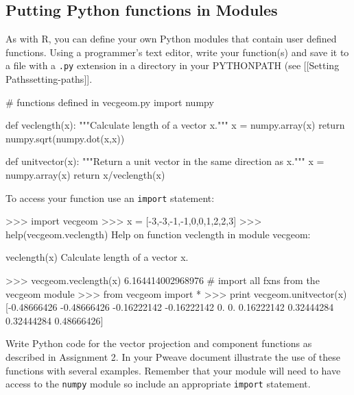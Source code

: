 \subsection{Putting Python functions in Modules}

As with R, you can define your own Python modules that contain user
defined functions. Using a programmer's text editor, write your
function(s) and save it to a file with a \lstinline!.py! extension in a
directory in your PYTHONPATH (see {[}{[}Setting
Paths\textbar{}setting-paths{]}{]}.

\begin{python}
# functions defined in vecgeom.py
import numpy

def veclength(x):
    """Calculate length of a vector x.""" 
    x = numpy.array(x)
    return numpy.sqrt(numpy.dot(x,x))


def unitvector(x):
    """Return a unit vector in the same direction as x."""
    x = numpy.array(x)
    return x/veclength(x)
\end{python}
%
To access your function use an \lstinline!import! statement:
%
\begin{python}
>>> import vecgeom
>>> x = [-3,-3,-1,-1,0,0,1,2,2,3]
>>> help(vecgeom.veclength)
Help on function veclength in module vecgeom:

veclength(x)
    Calculate length of a vector x.

>>> vecgeom.veclength(x)
6.164414002968976
# import all fxns from the vecgeom module
>>> from vecgeom import * 
>>> print vecgeom.unitvector(x)
[-0.48666426 -0.48666426 -0.16222142 -0.16222142  0.          0.   
     0.16222142  0.32444284  0.32444284  0.48666426]
\end{python}

\begin{assignment}
Write Python code for the vector projection and
component functions as described in Assignment 2. In your Pweave
document illustrate the use of these functions with several examples.
Remember that your module will need to have access to the
\lstinline!numpy! module so include an appropriate \lstinline!import!
statement.
\end{assignment}